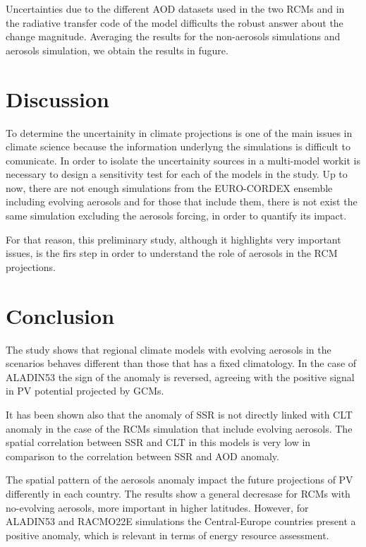 Uncertainties due to the different AOD datasets used in the two RCMs and in the radiative transfer code of the model difficults the robust answer about the change magnitude. Averaging the results for the non-aerosols simulations and aerosols simulation, we obtain the results in fugure.

\section{Discussion}

To determine the uncertainity in climate projections is one of the main issues in climate science because the information underlyng the simulations is difficult to comunicate. In order to isolate the uncertainity sources in a multi-model workit is necessary to design a sensitivity test for each of the models in the study. Up to now, there are not enough simulations from the EURO-CORDEX ensemble including evolving aerosols and for those that include them, there is not exist the same simulation excluding the aerosols forcing, in order to quantify its impact.

For that reason, this preliminary study, although it highlights very important issues, is the firs step in order to understand the role of aerosols in the RCM projections.

\section{Conclusion}

The study shows that regional climate models with evolving aerosols in the scenarios behaves different than those that has a fixed climatology. In the case of ALADIN53 the sign of the anomaly is reversed, agreeing with the positive signal in PV potential projected by GCMs.

It has been shown also that the anomaly of SSR is not directly linked with CLT anomaly in the case of the RCMs simulation that include evolving aerosols. The spatial correlation between SSR and CLT in this models is very low in comparison to the correlation between SSR and AOD anomaly.

The spatial pattern of the aerosols anomaly impact the future projections of PV differently in each country. The results show a general decresase for RCMs with no-evolving aerosols, more important in higher latitudes. However, for ALADIN53 and RACMO22E simulations the Central-Europe countries present a positive anomaly, which is relevant in terms of energy resource assessment.
% 